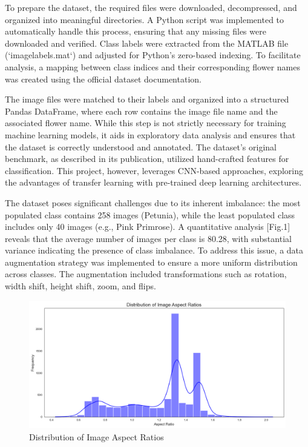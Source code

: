 \vspace{0.3cm}

To prepare the dataset, the required files were downloaded, decompressed, and organized into meaningful directories.
A Python script was implemented to automatically handle this process, ensuring that any missing files were downloaded
and verified. Class labels were extracted from the MATLAB file (`imagelabels.mat`) and adjusted for Python’s zero-based
indexing. To facilitate analysis, a mapping between class indices and their corresponding flower names was created using
the official dataset documentation.

\vspace{0.3cm}

The image files were matched to their labels and organized into a structured Pandas
DataFrame, where each row contains the image file name and the associated flower name. While this step is not strictly
necessary for training machine learning models, it aids in exploratory data analysis and ensures that the dataset is
correctly understood and annotated. The dataset's original benchmark, as described in its publication, utilized
hand-crafted features for classification. This project, however, leverages CNN-based approaches, exploring the
advantages of transfer learning with pre-trained deep learning architectures.

\vspace{0.3cm}

The dataset poses significant challenges due to its inherent imbalance: the most populated class contains 258 images
(Petunia), while the least populated class includes only 40 images (e.g., Pink Primrose). A quantitative analysis
[Fig.1] reveals that the average number of images per class is 80.28, with substantial variance indicating the presence
of class imbalance. To address this issue, a data augmentation strategy was implemented to ensure a more uniform distribution
across classes. The augmentation included transformations such as rotation, width shift, height shift, zoom, and flips.

\begin{figure}[h!]
    \centering
    \includegraphics[width=\linewidth]{Images/Distribution of Image Aspect Ratios}
    \caption{Distribution of Image Aspect Ratios}
\end{figure}

